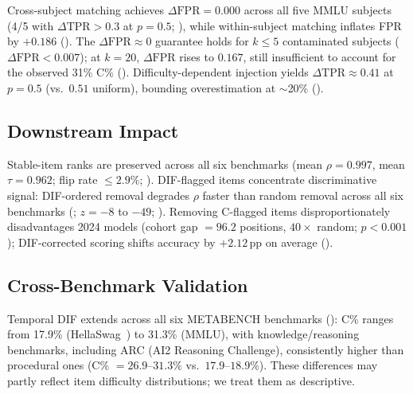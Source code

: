 Cross-subject matching achieves $\Delta\mathrm{FPR} = 0.000$ across all five MMLU subjects (4/5 with $\Delta\mathrm{TPR} > 0.3$ at $p = 0.5$; ), while within-subject matching inflates FPR by ${+}0.186$ (). The $\Delta\mathrm{FPR} \approx 0$ guarantee holds for $k \leq 5$ contaminated subjects ($\Delta\mathrm{FPR} < 0.007$); at $k{=}20$, $\Delta\mathrm{FPR}$ rises to $0.167$, still insufficient to account for the observed 31\% C\% (). Difficulty-dependent injection yields $\Delta\mathrm{TPR} \approx 0.41$ at $p = 0.5$ (vs.\ $0.51$ uniform), bounding overestimation at ${\sim}$20\% ().

\subsection{Downstream Impact}
\label{sec:downstream}

Stable-item ranks are preserved across all six benchmarks (mean $\rho = 0.997$, mean $\tau = 0.962$; flip rate $\leq 2.9\%$; ). DIF-flagged items concentrate discriminative signal: DIF-ordered removal degrades $\rho$ faster than random removal across all six benchmarks (; $z = -8$ to $-49$; ). Removing C-flagged items disproportionately disadvantages 2024 models (cohort gap $= 96.2$ positions, $40\times$ random; $p < 0.001$); DIF-corrected scoring shifts accuracy by ${+}2.12$\,pp on average ().

\subsection{Cross-Benchmark Validation}
\label{sec:gsm8k}

Temporal DIF extends across all six METABENCH benchmarks (): C\% ranges from 17.9\% (HellaSwag~\citep{zellers2019hellaswag}) to 31.3\% (MMLU), with knowledge/reasoning benchmarks, including ARC (AI2 Reasoning Challenge), consistently higher than procedural ones (C\% $= 26.9$--$31.3\%$ vs.\ $17.9$--$18.9\%$). These differences may partly reflect item difficulty distributions; we treat them as descriptive.

